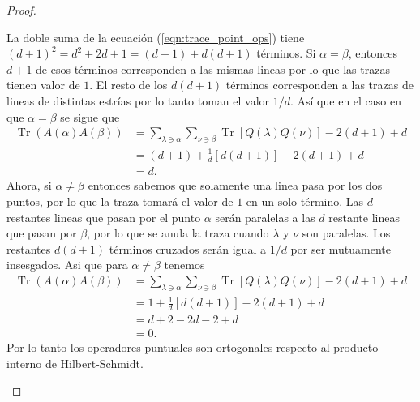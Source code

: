 \documentclass[a4paper,11pt]{report}
\DeclareMathOperator{\Tr}{Tr}
\begin{document}
\begin{proof}
\begin{enumerate}
        La doble suma de la ecuación
        (\ref{eqn:trace_point_ops}) tiene $(d+1)^2 = d^2 +
        2d + 1 = (d+1) + d(d+1)$ términos. Si $\alpha =
        \beta$, entonces $d+1$ de esos términos corresponden
        a las mismas lineas por lo que las trazas tienen
        valor de $1$. El resto de los $d(d+1)$ términos
        corresponden a las trazas de lineas de distintas
        estrías por lo tanto toman el valor $1 / d$. Así que
        en el caso en que $\alpha = \beta$ se sigue que
        \begin{align}
          \Tr\left( A(\alpha)A(\beta) \right) 
          &= \sum_{\lambda \ni \alpha}^{} 
          \sum_{\nu \ni \beta}^{}
          \Tr\left[Q(\lambda)Q(\nu)\right]
          - 2(d+1) + d \\
          &= (d+1) + \frac{1}{d}[d(d+1)] - 2(d+1) + d \\
          &= d.
        \end{align}
        Ahora, si $\alpha \neq \beta$ entonces sabemos que
        solamente una linea pasa por los dos puntos, por lo
        que la traza tomará el valor de $1$ en un solo
        término. Las $d$ restantes lineas que pasan por el
        punto $\alpha$ serán paralelas a las $d$ restante
        lineas que pasan por $\beta$, por lo que se anula la
        traza cuando $\lambda$ y $\nu$ son paralelas. Los 
        restantes $d(d+1)$ términos cruzados serán igual a
        $1 / d$ por ser mutuamente insesgados. Asi que para
        $\alpha \neq \beta$ tenemos
        \begin{align}
          \Tr\left( A(\alpha)A(\beta) \right) 
          &=  \sum_{\lambda \ni \alpha}^{} 
          \sum_{\nu \ni \beta}^{}
          \Tr\left[Q(\lambda)Q(\nu)\right]
          - 2(d+1) + d \\
          &= 1 + \frac{1}{d} [d(d+1)] - 2(d+1) + d \\
          &= d + 2 - 2d - 2 + d \\
          &= 0.
        \end{align}
        Por lo tanto los operadores puntuales son
        ortogonales respecto al producto interno de
        Hilbert-Schmidt.
    \end{enumerate}
  \end{proof}
\end{document}
